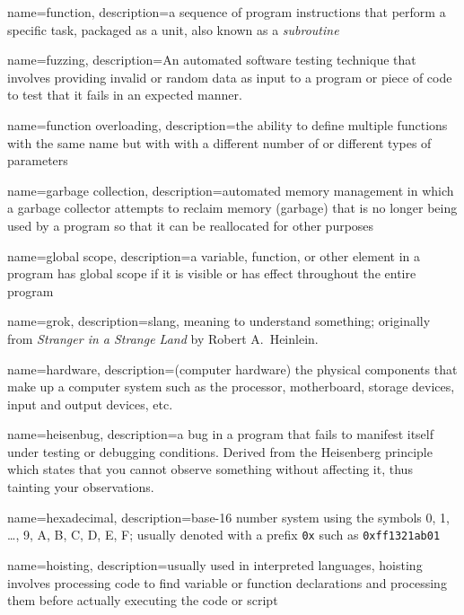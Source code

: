 {
  name=function,
  description={a sequence of program instructions that perform a specific task, packaged as a unit, also
  known as a \emph{subroutine}}
}

{
  name=fuzzing,
  description={An automated software testing technique that involves providing invalid or random data as input to a program or piece of code to test that it fails in an expected manner.}
}

{
  name=function overloading,
  description={the ability to define multiple functions with the same name but with with a different number of or different types of parameters}
}

{
  name=garbage collection,
  description={automated memory management in which a garbage collector attempts to reclaim memory (garbage) that is no
	longer being used by a program so that it can be reallocated for other purposes}
}

{
  name=global scope,
  description={a variable, function, or other element in a program has global scope if it is visible or has effect throughout
  	the entire program}
}

{
  name=grok,
  description={slang, meaning to understand something; originally from \emph{Stranger in a Strange Land} by Robert A.\ Heinlein.}
}

{
  name=hardware,
  description={(computer hardware) the physical components that make up a computer system such as the processor, motherboard, storage devices, input and output devices, etc.}
}

{
  name=heisenbug,
  description={a bug in a program that fails to manifest itself under testing or debugging conditions.  Derived from the Heisenberg principle which states that you cannot observe something without affecting it, thus tainting your observations.}
}

{
  name=hexadecimal,
  description={base-16 number system using the symbols 0, 1, \ldots, 9, A, B, C, D, E, F; usually denoted with a prefix \texttt{0x} such as
\texttt{0xff1321ab01}}
}


{
  name=hoisting,
  description={usually used in interpreted languages, hoisting involves processing code to find variable or function declarations and processing them before actually executing the code or script}
}

